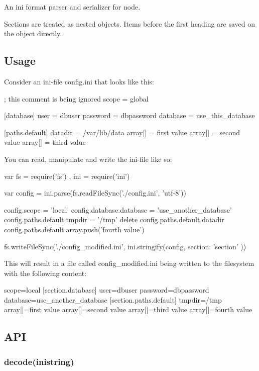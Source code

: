 An ini format parser and serializer for node.

Sections are treated as nested objects. Items before the first heading are saved on the object directly.

\subsection*{Usage}

Consider an ini-\/file {\ttfamily config.\+ini} that looks like this\+: \begin{DoxyVerb}; this comment is being ignored
scope = global

[database]
user = dbuser
password = dbpassword
database = use_this_database

[paths.default]
datadir = /var/lib/data
array[] = first value
array[] = second value
array[] = third value
\end{DoxyVerb}


You can read, manipulate and write the ini-\/file like so\+: \begin{DoxyVerb}var fs = require('fs')
  , ini = require('ini')

var config = ini.parse(fs.readFileSync('./config.ini', 'utf-8'))

config.scope = 'local'
config.database.database = 'use_another_database'
config.paths.default.tmpdir = '/tmp'
delete config.paths.default.datadir
config.paths.default.array.push('fourth value')

fs.writeFileSync('./config_modified.ini', ini.stringify(config, { section: 'section' }))
\end{DoxyVerb}


This will result in a file called {\ttfamily config\+\_\+modified.\+ini} being written to the filesystem with the following content\+: \begin{DoxyVerb}[section]
scope=local
[section.database]
user=dbuser
password=dbpassword
database=use_another_database
[section.paths.default]
tmpdir=/tmp
array[]=first value
array[]=second value
array[]=third value
array[]=fourth value
\end{DoxyVerb}


\subsection*{A\+PI}

\subsubsection*{decode(inistring)}


